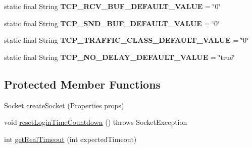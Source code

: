\begin{DoxyCompactItemize}
\item 
\mbox{\label{classcom_1_1mysql_1_1jdbc_1_1_standard_socket_factory_a38c131fdf0d90407ce83008d459b1efa}} 
static final String {\bfseries T\+C\+P\+\_\+\+R\+C\+V\+\_\+\+B\+U\+F\+\_\+\+D\+E\+F\+A\+U\+L\+T\+\_\+\+V\+A\+L\+UE} = \char`\"{}0\char`\"{}
\item 
\mbox{\label{classcom_1_1mysql_1_1jdbc_1_1_standard_socket_factory_af464847ee187b7ed4e33c6e929d78262}} 
static final String {\bfseries T\+C\+P\+\_\+\+S\+N\+D\+\_\+\+B\+U\+F\+\_\+\+D\+E\+F\+A\+U\+L\+T\+\_\+\+V\+A\+L\+UE} = \char`\"{}0\char`\"{}
\item 
\mbox{\label{classcom_1_1mysql_1_1jdbc_1_1_standard_socket_factory_a654c0fac6e6db86466678ff31c6fda71}} 
static final String {\bfseries T\+C\+P\+\_\+\+T\+R\+A\+F\+F\+I\+C\+\_\+\+C\+L\+A\+S\+S\+\_\+\+D\+E\+F\+A\+U\+L\+T\+\_\+\+V\+A\+L\+UE} = \char`\"{}0\char`\"{}
\item 
\mbox{\label{classcom_1_1mysql_1_1jdbc_1_1_standard_socket_factory_a0dbd1dd82647badf9e30e887b731fcaf}} 
static final String {\bfseries T\+C\+P\+\_\+\+N\+O\+\_\+\+D\+E\+L\+A\+Y\+\_\+\+D\+E\+F\+A\+U\+L\+T\+\_\+\+V\+A\+L\+UE} = \char`\"{}true\char`\"{}
\end{DoxyCompactItemize}
\subsection*{Protected Member Functions}
\begin{DoxyCompactItemize}
\item 
Socket \mbox{\hyperlink{classcom_1_1mysql_1_1jdbc_1_1_standard_socket_factory_ac59fccd4861f3da102251a22ec119aeb}{create\+Socket}} (Properties props)
\item 
void \mbox{\hyperlink{classcom_1_1mysql_1_1jdbc_1_1_standard_socket_factory_ad78f473677314a3dc66e326b8dd3ba2a}{reset\+Login\+Time\+Countdown}} ()  throws Socket\+Exception 
\item 
int \mbox{\hyperlink{classcom_1_1mysql_1_1jdbc_1_1_standard_socket_factory_ae455f41cfd47611b1f979ce4c2f7cbec}{get\+Real\+Timeout}} (int expected\+Timeout)
\end{DoxyCompactItemize}
